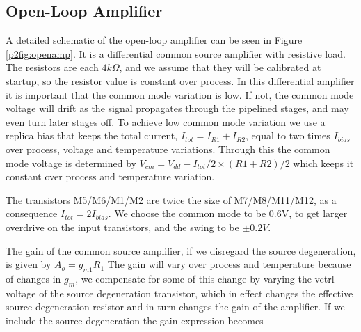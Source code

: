 
\subsection{Open-Loop Amplifier}

A detailed schematic of the open-loop amplifier can be seen in  Figure
\ref{p2fig:openamp}. It is a differential common source amplifier with
resistive load. The resistors are each $4k\Omega$, and we assume that they
will be calibrated at startup, so the resistor value is constant over
process. In this differential amplifier it is important that the common
mode variation is low. If not, the common mode voltage will drift as
the signal propagates through the pipelined stages, and may even turn later
stages off. To achieve low common mode variation we use a replica bias that
keeps the total current, $I_{tot} = I_{R1} +I_{R2}$, equal to two times
$I_{bias}$ over process, voltage and temperature variations. Through
this the common mode voltage is determined by 
$V_{cm} = V_{dd} -  I_{tot}/2 \times (R1+R2)/2 $
which keeps it constant over process and temperature variation. 

The
transistors M5/M6/M1/M2 are twice the size of M7/M8/M11/M12, as a
consequence $I_{tot} = 2I_{bias}$. We choose the common mode to be
0.6V, to get larger overdrive on the input transistors, and the swing
to be $\pm 0.2V$.

The gain of the common source amplifier, if we disregard the source
degeneration, is given by $A_o = g_{m1}R_1$
%
%
The gain will vary over process and temperature because of changes in
$g_m$, we compensate for some of this change by varying the vctrl
voltage of the source degeneration transistor, which  in effect
changes the effective source degeneration resistor and in turn changes
the gain of the amplifier. If we include the
source degeneration the gain
expression becomes


